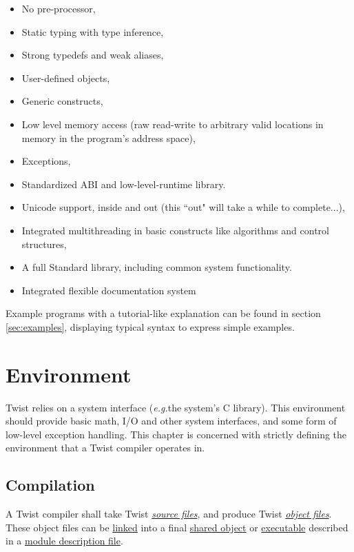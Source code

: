 \documentclass[a4paper,11pt]{report}
\newcommand{\eg}{\textit{e.g.}}
\begin{document}
\begin{itemize}
 \item No pre-processor,
 \item Static typing with type inference,
 \item Strong typedefs and weak aliases,
 \item User-defined objects,
 \item Generic constructs,
 \item Low level memory access (raw read-write to arbitrary valid locations in memory in the program's address space),
 \item Exceptions,
 \item Standardized ABI and low-level-runtime library.
 \item Unicode support, inside and out (this ``out" will take a while to complete...),
 \item Integrated multithreading in basic constructs like algorithms and control structures,
 \item A full Standard library, including common system functionality.
 \item Integrated flexible documentation system
\end{itemize}
Example programs with a tutorial-like explanation can be found in section \ref{sec:examples}, displaying typical syntax to express simple examples.

\chapter{Environment}

Twist relies on a system interface (\eg the system's C library).
This environment should provide basic math, I/O and other system interfaces, and some form of low-level exception handling.
This chapter is concerned with strictly defining the environment that a Twist compiler operates in.

\section{Compilation}

A Twist compiler shall take Twist \hyperref[sec:source_files]{\emph{source files}}, and produce Twist \hyperref[sec:object_files]{\emph{object files}}.
These object files can be \hyperref[sec:linking]{linked} into a final \hyperref[sec:shared_objects]{shared object} or \hyperref[sec:executables]{executable} described in a \hyperref[sec:module_description_files]{module description file}.
\end{document}
